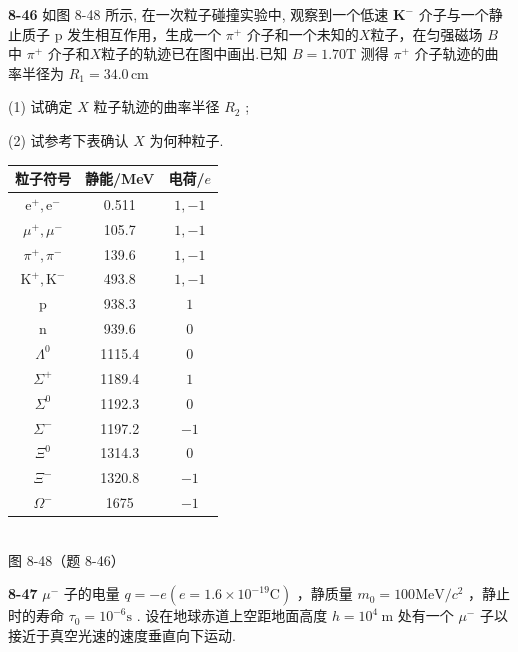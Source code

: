 \textbf{8-46} 如图 8-48 所示, 在一次粒子碰撞实验中, 观察到一个低速 $\mathbf{K}^{-}$ 介子与一个静止质子 $\mathrm p$ 发生相互作用，生成一个 $\pi^{+}$ 介子和一个未知的$X$粒子，在匀强磁场 $B$ 中 $\pi^{+}$ 介子和$X$粒子的轨迹已在图中画出.已知 $B = 1.70\mathrm{T}$ 测得 $\pi^{+}$ 介子轨迹的曲率半径为 $R_1=34.0\,\mathrm{cm}$

(1) 试确定 $X$ 粒子轨迹的曲率半径 $R_{2}$ ;

(2) 试参考下表确认 $X$ 为何种粒子.



\begin{center}
\begin{tabular}{|c|c|c|}
\hline
粒子符号 & 静能/MeV & 电荷/$e$ \\
\hline
$\mathrm{e}^+, \mathrm{e}^-$ & 0.511 & $1, -1$ \\
$\mu^+, \mu^-$ & 105.7 & $1, -1$ \\
$\pi^+, \pi^-$ & 139.6 & $1, -1$ \\
$\mathrm{K}^+, \mathrm{K}^-$ & 493.8 & $1, -1$ \\
$\mathrm{p}$ & 938.3 & $1$ \\
$\mathrm{n}$ & 939.6 & $0$ \\
$\Lambda^0$ & 1115.4 & $0$ \\
$\Sigma^+$ & 1189.4 & $1$ \\
$\Sigma^0$ & 1192.3 & $0$ \\
$\Sigma^-$ & 1197.2 & $-1$ \\
$\Xi^0$ & 1314.3 & $0$ \\
$\Xi^-$ & 1320.8 & $-1$ \\
$\Omega^-$ & 1675 & $-1$ \\
\hline
\end{tabular}
\end{center}

\begin{center}
\resizebox{0.45\textwidth}{!}{}\\[4pt]
{\small 图 8-48（题 8-46）}
\end{center}

\newpage

\textbf{8-47} $\mu^{-}$ 子的电量 $q = -e(e = 1.6 \times 10^{-19} \mathrm{C})$ ，静质量 $m_0 = 100 \mathrm{MeV} / c^2$ ，静止时的寿命 $\tau_0 = 10^{-6} \mathrm{s}$ . 设在地球赤道上空距地面高度 $h = 10^4 \mathrm{~m}$ 处有一个 $\mu^{-}$ 子以接近于真空光速的速度垂直向下运动.

